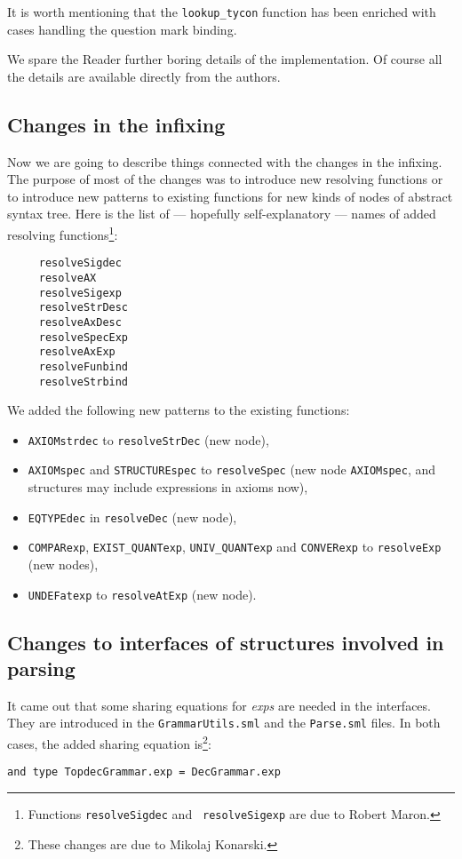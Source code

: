 \noindent It is worth mentioning that the {\tt lookup\_tycon} function has
been enriched with cases handling the question mark binding.

We spare the Reader further boring details of the implementation. Of
course all the details are available directly from the authors.

\subsection{Changes in the infixing}
\label{sec:infix}

Now we are going to describe things connected with the changes in the
infixing. The purpose of most of the changes was to introduce new
resolving functions or to introduce new patterns to existing functions
for new kinds of nodes of abstract syntax tree. Here is the list of
--- hopefully self-explanatory --- names of added resolving
functions\footnote{\noindent Functions {\tt resolveSigdec} and {\tt
resolveSigexp} are due to Robert Maron.}: {\small
\begin{verbatim}
     resolveSigdec
     resolveAX
     resolveSigexp
     resolveStrDesc
     resolveAxDesc
     resolveSpecExp
     resolveAxExp
     resolveFunbind
     resolveStrbind
\end{verbatim}}

We added the following new patterns to the existing functions:
\begin{itemize}
\item {\tt AXIOMstrdec} to {\tt resolveStrDec} (new node),
\item {\tt AXIOMspec} and {\tt STRUCTUREspec} to {\tt resolveSpec}
  (new node {\tt AXIOMspec}, and structures may include expressions in
  axioms now),
\item {\tt EQTYPEdec} in {\tt resolveDec} (new node),
\item {\tt COMPARexp}, {\tt EXIST\_QUANTexp}, {\tt UNIV\_QUANTexp} and
  {\tt CONVERexp} to {\tt resolveExp} (new nodes),
\item {\tt UNDEFatexp} to {\tt resolveAtExp} (new node).
\end{itemize}

\subsection{Changes to interfaces of structures involved in parsing}
\label{sec:inter}

It came out that some sharing equations for {\it exps} are needed in
the interfaces. They are introduced in the {\tt GrammarUtils.sml} and
the {\tt Parse.sml} files. In both cases, the added sharing equation
is\footnote{These changes are due to Mikolaj Konarski.}:

\begin{verbatim}
and type TopdecGrammar.exp = DecGrammar.exp
\end{verbatim}

